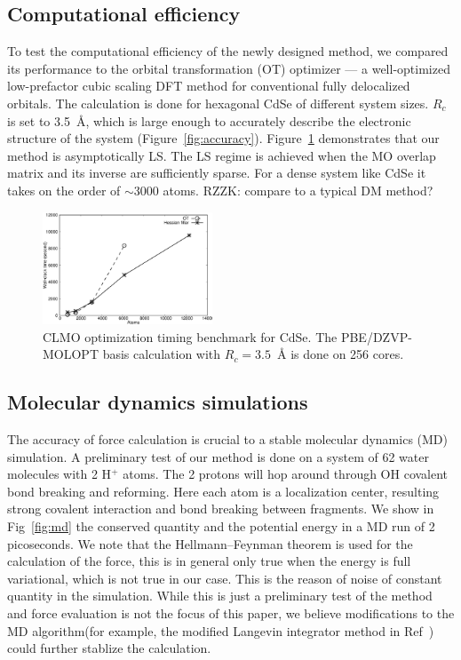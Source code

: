 \documentclass[aps,prl,twocolumn,reprint,amsmath,amssymb]{revtex4-1}
\begin{document}
\subsection{Computational efficiency}

To test the computational efficiency of the newly designed method, we compared its performance to the orbital transformation (OT) optimizer \cite{weber2008direct,vandevondele2003efficient} --- a well-optimized low-prefactor cubic scaling DFT method for conventional fully delocalized orbitals. The calculation is done for hexagonal CdSe of different system sizes. $R_c$ is set to 3.5~{\AA}, which is large enough to accurately describe the electronic structure of the system (Figure~\ref{fig:accuracy}). Figure~\ref{fig:scaling} demonstrates that our method is asymptotically LS. The LS regime is achieved when the MO overlap matrix and its inverse are sufficiently sparse. For a dense system like CdSe it takes on the order of $\sim$3000 atoms. RZZK: compare to a typical DM method?

\begin{figure}
\centering
\includegraphics[width=0.45\textwidth]{timing}
\caption{CLMO optimization timing benchmark for CdSe. The PBE/DZVP-MOLOPT basis calculation with $R_c=3.5$~{\AA} is done on 256 cores.}
\label{fig:scaling}
\end{figure}


\subsection{Molecular dynamics simulations} 

The accuracy of force calculation is crucial to a stable molecular dynamics (MD) simulation. A preliminary test of our method is done on a system of 62 water molecules with 2 H$^+$ atoms. The 2 protons will hop around through OH covalent bond breaking and reforming. Here each atom is a localization center, resulting strong covalent interaction and bond breaking between fragments. We show in Fig~\ref{fig:md} the conserved quantity and the potential energy in a MD run of 2 picoseconds. We note that the Hellmann--Feynman theorem\cite{feynman1939forces} is used for the calculation of the force, this is in general only true when the energy is full variational, which is not true in our case. This is the reason of noise of constant quantity in the simulation. While this is just a preliminary test of the method and force evaluation is not the focus of this paper, we believe modifications to the MD algorithm(for example, the modified Langevin integrator method in Ref~) could further stablize the calculation.
\end{document}
